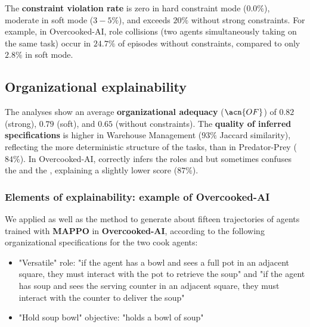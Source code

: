 The \textbf{constraint violation rate} is zero in hard constraint mode ($0.0\%$), moderate in soft mode ($3-5\%$), and exceeds $20\%$ without strong constraints.
For example, in Overcooked-AI, role collisions (two agents simultaneously taking on the same task) occur in $24.7\%$ of episodes without constraints, compared to only $2.8\%$ in soft mode.

\subsection*{Organizational explainability}

The  analyses show an average \textbf{organizational adequacy} ($\acn{OF}$) of $0.82$ (strong), $0.79$ (soft), and $0.65$ (without constraints).
The \textbf{quality of inferred specifications} is higher in Warehouse Management ($93\%$ Jaccard similarity), reflecting the more deterministic structure of the tasks, than in Predator-Prey ($84\%$).
In Overcooked-AI,  correctly infers the roles  and  but sometimes confuses the  and the , explaining a slightly lower score ($87\%$).


\subsubsection*{Elements of explainability: example of Overcooked-AI}

We applied  as well as the  method to generate about fifteen trajectories of agents trained with \textbf {MAPPO} in \textbf{Overcooked-AI}, according to the following organizational specifications for the two cook agents:
%
\begin{itemize}
  \item "Versatile" role: "if the agent has a bowl and sees a full pot in an adjacent square, they must interact with the pot to retrieve the soup" and "if the agent has soup and sees the serving counter in an adjacent square, they must interact with the counter to deliver the soup"
  \item "Hold soup bowl" objective: "holds a bowl of soup"
\end{itemize}

